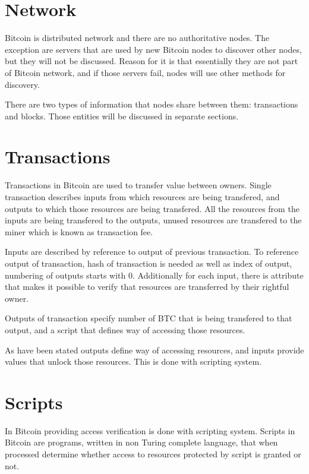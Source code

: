 \documentclass[12pt, en, eng, oneside, final]{mgr}
\begin{document}
\section{Network}
Bitcoin is distributed network and there are no authoritative nodes. The exception are servers that are used by new Bitcoin nodes to discover other nodes, but they will not be discussed. Reason for it is that essentially they are not part of Bitcoin network, and if those servers fail, nodes will use other methods for discovery. \cite{bitcoin-paper-1}

There are two types of information that nodes share between them: transactions and blocks\cite{bitcoin-paper-1}. Those entities will be discussed in separate sections.

\section{Transactions}
Transactions in Bitcoin are used to transfer value between owners. Single transaction describes inputs from which resources are being transfered, and outputs to which those resources are being transfered. All the resources from the inputs are being transfered to the outputs, unused resources are transfered to the miner which is known as transaction fee.

Inputs are described by reference to output of previous transaction. To reference output of transaction, hash of transaction is needed as well as index of output, numbering of outputs starts with 0. Additionally for each input, there is attribute that makes it possible to verify that resources are transferred by their rightful owner. \cite{bitcoin-transaction}

Outputs of transaction specify number of BTC that is being transfered to that output, and a script that defines way of accessing those resources. 

As have been stated outputs define way of accessing resources, and inputs provide values that unlock those resources. This is done with scripting system.

\section{Scripts}
In Bitcoin providing access verification is done with scripting system. Scripts in Bitcoin are programs, written in non Turing complete language, that when processed determine whether access to resources protected by script is granted or not. \cite{bitcoin-script}
\end{document}
